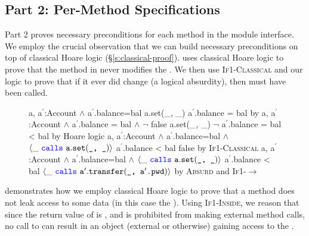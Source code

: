 \subsection{Part 2: Per-Method \Nec Specifications}
\label{s:BA-classical}
Part 2 proves necessary preconditions for each method in 
the module interface. We employ the crucial observation that
we can build necessary preconditions on top of classical 
Hoare logic (\S \ref{s:classical-proof}).
\textbf{} uses classical Hoare logic
to prove that the  method in 
never modifies the . We then use \textsc{If1-Classical}
and our \Nec logic to prove that if it ever did change (a logical absurdity),
then  must have been called.
\begin{figure}[htb]
{
	\begin{proofexample}
			{\proofstepwithrule
				{\hoareEx
						{a, a$^\prime$:Account $\wedge$ a$^\prime$.balance=bal}
						{a.set(\_, \_)}
						{a$^\prime$.balance = bal}
						}
					{by \funcSpec}
			}
			{\proofstepwithrule
				{\hoareEx
						{a, a$^\prime$:Account $\wedge$ a$^\prime$.balance = bal $\wedge$ $\neg$ false}
						{a.set(\_, \_)}
						{$\neg$ a$^\prime$.balance = bal < bal}
						}
					{by Hoare logic}
			}
			{\proofstepwithrule
				{\onlyIfSingleExAlt
						{a, a$^\prime$:Account $\wedge$ a$^\prime$.balance=bal $\wedge$ $\langle \_\ {\color{blue}\texttt{calls}}\ {\texttt{a}}.{\texttt{set}}({\texttt{\_, \_}}) \rangle$}
						{a$^\prime$.balance < bal}
						{false}
						}
					{by \textsc{If1-Classical}}
			}
			{\proofstepwithrule
				{\onlyIfSingleExAlt
						{a, a$^\prime$:Account $\wedge$ a$^\prime$.balance=bal $\wedge$ $\langle \_\ {\color{blue}\texttt{calls}}\ {\texttt{a}}.{\texttt{set}}({\texttt{\_, \_}}) \rangle$}
						{a$^\prime$.balance < bal}
						{$\langle \_\ {\color{blue}\texttt{calls}}\ {\texttt{a}}^\prime.{\texttt{transfer}}({\texttt{\_, a$^\prime$.pwd}}) \rangle$}
						}
					{by \textsc{Absurd} and \textsc{If1-}$\longrightarrow$}
			}
		\endproofsteps
	\end{proofexample}
}
\end{figure}
\textbf{} demonstrates how we employ classical Hoare logic
to prove that a method does not leak access to some data (in this case the ).
Using \textsc{If1-Inside}, we reason that since the return value of  is
, and  is prohibited from making external method calls,
no call to  can result in an object (external or otherwise) gaining access to the .
